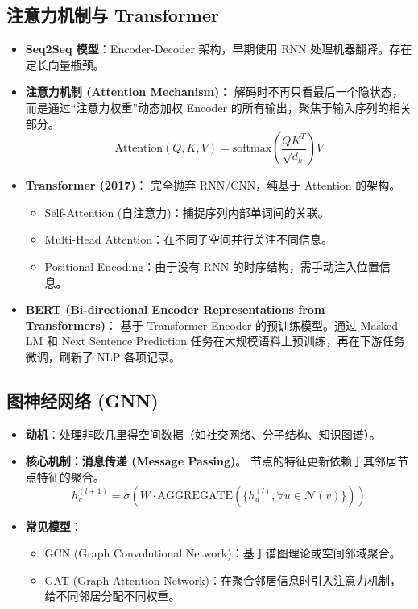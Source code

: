 \documentclass[a4paper, 11pt]{ctexart}
\begin{document}
\subsection{注意力机制与 Transformer}



\begin{itemize}
    \item \textbf{Seq2Seq 模型}：Encoder-Decoder 架构，早期使用 RNN 处理机器翻译。存在定长向量瓶颈。
    \item \textbf{注意力机制 (Attention Mechanism)}：
    解码时不再只看最后一个隐状态，而是通过“注意力权重”动态加权 Encoder 的所有输出，聚焦于输入序列的相关部分。
    $$ \text{Attention}(Q, K, V) = \text{softmax}\left(\frac{QK^T}{\sqrt{d_k}}\right)V $$
    \item \textbf{Transformer (2017)}：
    完全抛弃 RNN/CNN，纯基于 Attention 的架构。
    \begin{itemize}
        \item Self-Attention (自注意力)：捕捉序列内部单词间的关联。
        \item Multi-Head Attention：在不同子空间并行关注不同信息。
        \item Positional Encoding：由于没有 RNN 的时序结构，需手动注入位置信息。
    \end{itemize}
    \item \textbf{BERT (Bi-directional Encoder Representations from Transformers)}：
    基于 Transformer Encoder 的预训练模型。通过 Masked LM 和 Next Sentence Prediction 任务在大规模语料上预训练，再在下游任务微调，刷新了 NLP 各项记录。
\end{itemize}

\subsection{图神经网络 (GNN)}
\begin{itemize}
    \item \textbf{动机}：处理非欧几里得空间数据（如社交网络、分子结构、知识图谱）。
    \item \textbf{核心机制：消息传递 (Message Passing)}。
    节点的特征更新依赖于其邻居节点特征的聚合。
    $$ h_v^{(l+1)} = \sigma \left( W \cdot \text{AGGREGATE} (\{h_u^{(l)}, \forall u \in \mathcal{N}(v) \}) \right) $$
    \item \textbf{常见模型}：
    \begin{itemize}
        \item GCN (Graph Convolutional Network)：基于谱图理论或空间邻域聚合。
        \item GAT (Graph Attention Network)：在聚合邻居信息时引入注意力机制，给不同邻居分配不同权重。
    \end{itemize}
\end{itemize}
\end{document}
